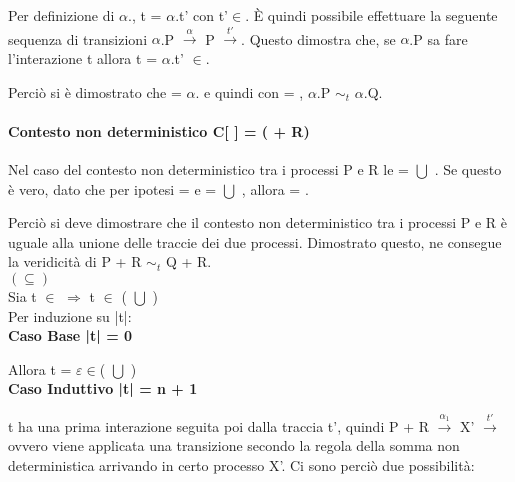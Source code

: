 Per definizione di $\alpha$., t = $\alpha$.t' con t'$\in$. È quindi possibile effettuare la seguente sequenza di transizioni $\alpha$.P $ \overset{\alpha}\rightarrow$ P $\overset{t'}\rightarrow $. Questo dimostra che, se $\alpha$.P sa fare l'interazione t allora t = $\alpha$.t' $\in$.

Perciò si è dimostrato che  = $\alpha$. e quindi con  = , $\alpha$.P $\sim_{t}$ $\alpha$.Q.
\\

\paragraph{Contesto non deterministico  C[ ] = (\hspace{0.3cm} + R)} \mbox{}

Nel caso del contesto non deterministico tra i processi P e R le  =  $\bigcup$ . Se questo è vero, dato che per ipotesi  =  e  =  $\bigcup$ , allora  =  .

Perciò si deve dimostrare che il contesto non deterministico tra i processi P e R è uguale alla unione delle traccie dei due processi. Dimostrato questo, ne consegue la veridicità di P + R $\sim_{t}$ Q + R.\\

$(\subseteq)$ \\

Sia t $\in$   $\Rightarrow$  t $\in$ ( $\bigcup$ )\\
Per induzione su |t|:
\\

\textbf{Caso Base |t| = 0}

Allora t = $\varepsilon \in$( $\bigcup$ )
\\

\textbf{Caso Induttivo |t| = n + 1}

t ha una prima interazione seguita poi dalla traccia t', quindi P + R $ \overset{\alpha_{1}}\rightarrow $ X' $\overset{t'}\rightarrow$ ovvero viene applicata una transizione secondo la regola della somma non deterministica arrivando in certo processo X'. Ci sono perciò due possibilità:

